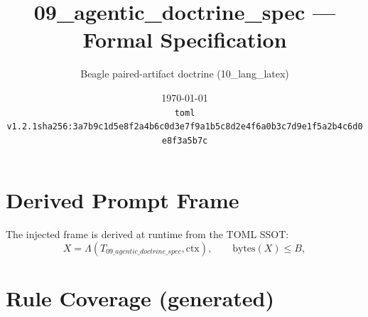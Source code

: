 \documentclass[11pt]{article}
\title{09\_agentic\_doctrine\_spec --- Formal Specification}
\author{Beagle paired-artifact doctrine (10\_lang\_latex)}
\date{\today\\ \texttt{toml v1.2.1\quad sha256:3a7b9c1d5e8f2a4b6c0d3e7f9a1b5c8d2e4f6a0b3c7d9e1f5a2b4c6d0e8f3a5b7c}}
\begin{document}
\maketitle

\section{Derived Prompt Frame}
The injected frame is derived at runtime from the TOML SSOT:
\begin{equation}
  X = \Lambda(T_{09\_agentic\_doctrine\_spec}, \mathrm{ctx}), \qquad \mathrm{bytes}(X) \le B,
  \label{lbl:derive-frame}
\end{equation}

\section{Rule Coverage (generated)}
\end{document}
